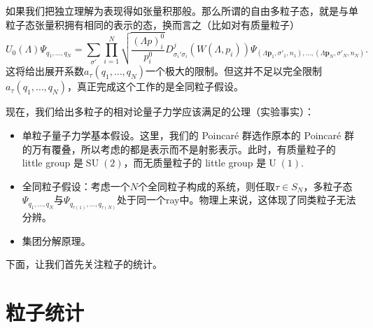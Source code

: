 \documentclass[11pt]{article}
\theoremstyle{definition}
\theoremstyle{plain}
\newtheorem{lem}[para]{Lemma}
\begin{document}
如果我们把独立理解为表现得如张量积那般。那么所谓的自由多粒子态，就是与单粒子态张量积拥有相同的表示的态，换而言之（比如对有质量粒子）
\[
	U_0(\Lambda)\Psi_{q_1,\dots,q_N}=\sum_{\sigma'}\prod_{i=1}^N \sqrt{\frac{(\Lambda p)^0_i}{p^0_i}}D^{j}_{\sigma_i'\sigma_i}(W(\Lambda,p_i))\Psi_{(\Lambda \bm{p}_1,\sigma'_1,n_1),\dots,(\Lambda \bm{p}_N,\sigma'_N,n_N)}.
\]
这将给出展开系数$a_\tau(q_{1},\dots,q_{N})$一个极大的限制。但这并不足以完全限制$a_\tau(q_{1},\dots,q_{N})$，真正完成这个工作的是全同粒子假设。

现在，我们给出多粒子的相对论量子力学应该满足的公理（实验事实）：
\begin{itemize}
\item 单粒子量子力学基本假设。这里，我们的 Poincar\'{e} 群选作原本的 Poincar\'{e} 群的万有覆叠，所以考虑的都是表示而不是射影表示。此时，有质量粒子的 little group 是$\operatorname{SU}(2)$，而无质量粒子的 little group 是$\operatorname{U}(1)$.
\item 全同粒子假设：考虑一个$N$个全同粒子构成的系统，则任取$\tau \in S_N$，多粒子态$\Psi_{q_1,\dots,q_N}$与$\Psi_{q_{\tau(1)},\dots,q_{\tau(N)}}$处于同一个ray中。物理上来说，这体现了同类粒子无法分辨。
\item 集团分解原理。
\end{itemize}
下面，让我们首先关注粒子的统计。

\section{粒子统计}



\end{document}
